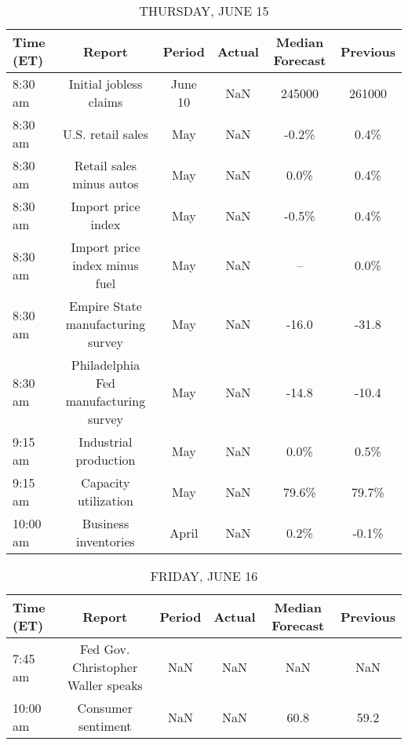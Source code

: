 \documentclass{article}%
\begin{document}
\begin{table}[htbp]%
\caption{THURSDAY, JUNE 15}%
\centering%
\begin{adjustbox}{width=1\textwidth}%
\begin{tabular}{lccccc}
\toprule
Time (ET) &                                Report &  Period & Actual & Median Forecast & Previous \\
\midrule
  8:30 am &                Initial jobless claims & June 10 &    NaN &          245000 &   261000 \\
  8:30 am &                     U.S. retail sales &     May &    NaN &           -0.2\% &     0.4\% \\
  8:30 am &              Retail sales minus autos &     May &    NaN &            0.0\% &     0.4\% \\
  8:30 am &                    Import price index &     May &    NaN &           -0.5\% &     0.4\% \\
  8:30 am &         Import price index minus fuel &     May &    NaN &              -- &     0.0\% \\
  8:30 am &     Empire State manufacturing survey &     May &    NaN &           -16.0 &    -31.8 \\
  8:30 am & Philadelphia Fed manufacturing survey &     May &    NaN &           -14.8 &    -10.4 \\
  9:15 am &                 Industrial production &     May &    NaN &            0.0\% &     0.5\% \\
  9:15 am &                  Capacity utilization &     May &    NaN &           79.6\% &    79.7\% \\
 10:00 am &                  Business inventories &   April &    NaN &            0.2\% &    -0.1\% \\
\bottomrule
\end{tabular}
%
\end{adjustbox}%
\end{table}

%


\begin{table}[htbp]%
\caption{FRIDAY, JUNE 16}%
\centering%
\begin{adjustbox}{width=1\textwidth}%
\begin{tabular}{lccccc}
\toprule
Time (ET) &                             Report & Period & Actual & Median Forecast & Previous \\
\midrule
  7:45 am & Fed Gov. Christopher Waller speaks &    NaN &    NaN &             NaN &      NaN \\
 10:00 am &                 Consumer sentiment &    NaN &    NaN &            60.8 &     59.2 \\
\bottomrule
\end{tabular}
%
\end{adjustbox}%
\end{table}
\end{document}
